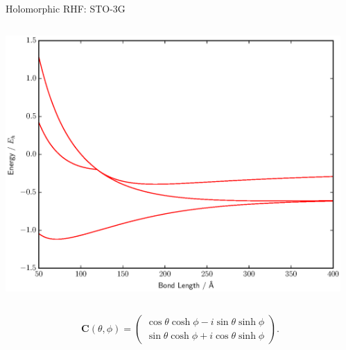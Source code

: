 \documentclass{beamer}
\begin{document}
\begin{frame}{Holomorphic RHF:  STO-3G}
 \begin{columns}
   \begin{column}{0.3\textwidth}
    \includegraphics[scale=0.25]{BFGS_RHF_HH_sto-3g}
   \end{column}
   \begin{column}{0.7\textwidth}
     \begin{center}
     \hspace{2em}
     \end{center} 
   \end{column}
 \end{columns}
 {\tiny $$ \mathbf{C}(\theta, \phi) = \left(
  \begin{matrix}
  \cos \theta \cosh \phi - i \sin \theta \sinh \phi \\  
  \sin \theta \cosh \phi  + i \cos \theta \sinh \phi
  \end{matrix} \right). $$}
\end{frame} 
\end{document}

